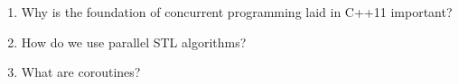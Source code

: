 \begin{enumerate}
\item 
Why is the foundation of concurrent programming laid in C++11 important?

\item 
How do we use parallel STL algorithms?

\item 
What are coroutines?
\end{enumerate}